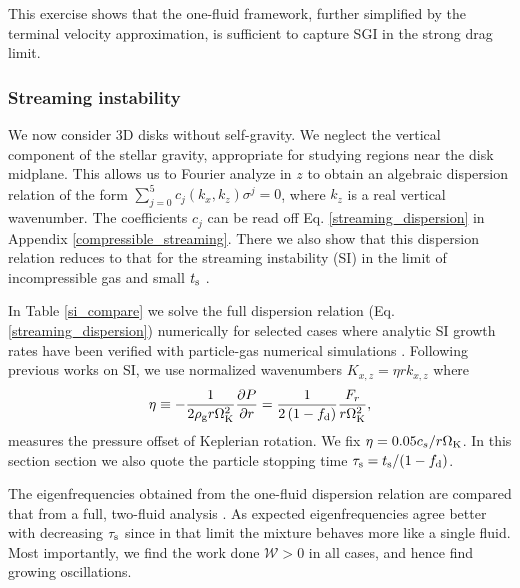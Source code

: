 This exercise shows that the one-fluid framework, further simplified by
the terminal velocity approximation, is sufficient to capture SGI
in the strong drag limit. 

\subsubsection{Streaming instability}\label{si}
We now consider 3D disks without self-gravity. We neglect the vertical     
component of the stellar gravity, appropriate for studying regions
near the disk midplane. This  
allows us to Fourier analyze in $z$ to obtain 
an algebraic dispersion relation of the form  
$\sum_{j=0}^{5}c_j(k_x,k_z)\sigma^j = 0$, where $k_z$ is a real
vertical wavenumber. The coefficients $c_j$ can be read 
off Eq. \ref{streaming_dispersion} in  Appendix \ref{compressible_streaming}. 
There we also show that this dispersion relation reduces to that for
the streaming instability (SI) in the limit of incompressible gas and small
$t_\mathrm{s}$ \citep{youdin05a,jacquet11}.   
 


In Table \ref{si_compare} we solve the full dispersion relation
(Eq. \ref{streaming_dispersion}) numerically for selected cases where
analytic SI growth rates have been verified with particle-gas
numerical simulations \citep[namely][]{youdin07b,bai10b}.  
Following previous works on SI, we use normalized 
wavenumbers $K_{x,z} = \eta r k_{x,z}$ where
\begin{align} 
  \eta \equiv -\frac{1}{2\rho_\mathrm{g} r\Omega_{\rm K}^2}\frac{\partial P}{\partial r} = 
  \frac{1}{2\left(1-f_\mathrm{d}\right)}\frac{F_r}{r\Omega_{\rm K}^2}, 
\end{align} 
measures the pressure offset of Keplerian rotation. We fix 
$\eta=0.05c_s/r\Omega_{\rm K}$. In this section section we also quote the
particle stopping time $\tau_\mathrm{s}=t_\mathrm{s}/(1-f_\mathrm{d})$.    

The eigenfrequencies obtained from the one-fluid dispersion relation 
are compared that from a full, two-fluid analysis \citep[similar 
to][]{youdin05a, kowalik13}. As expected eigenfrequencies agree better
with decreasing $\tau_\mathrm{s}$ since in that limit the mixture behaves more 
like a single fluid. Most importantly, we find the work done
$\mathcal{W}>0$ in all cases, and hence find growing oscillations. 

